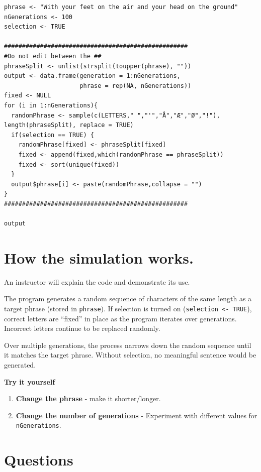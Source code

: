 \documentclass[
  a4paper]{book}
\providecommand{\tightlist}{%
  \setlength{\itemsep}{0pt}\setlength{\parskip}{0pt}}
\begin{document}
\begin{verbatim}
phrase <- "With your feet on the air and your head on the ground"
nGenerations <- 100
selection <- TRUE

###################################################
#Do not edit between the ##
phraseSplit <- unlist(strsplit(toupper(phrase), ""))
output <- data.frame(generation = 1:nGenerations, 
                     phrase = rep(NA, nGenerations))
fixed <- NULL
for (i in 1:nGenerations){
  randomPhrase <- sample(c(LETTERS," ","'","Å","Æ","Ø","!"), length(phraseSplit), replace = TRUE)
  if(selection == TRUE) {
    randomPhrase[fixed] <- phraseSplit[fixed]
    fixed <- append(fixed,which(randomPhrase == phraseSplit))
    fixed <- sort(unique(fixed))
  }
  output$phrase[i] <- paste(randomPhrase,collapse = "")
}
###################################################

output
\end{verbatim}

\section{How the simulation works.}\label{how-the-simulation-works.}

An instructor will explain the code and demonstrate its use.

The program generates a random sequence of characters of the same length as a target phrase (stored in \texttt{phrase}). If selection is turned on (\texttt{selection\ \textless{}-\ TRUE}), correct letters are ``fixed'' in place as the program iterates over generations. Incorrect letters continue to be replaced randomly.

Over multiple generations, the process narrows down the random sequence until it matches the target phrase. Without selection, no meaningful sentence would be generated.

\textbf{Try it yourself }

\begin{enumerate}
\def\labelenumi{\arabic{enumi})}
\tightlist
\item
  \textbf{Change the phrase} - make it shorter/longer.
\item
  \textbf{Change the number of generations} - Experiment with different values for \texttt{nGenerations}.
\end{enumerate}

\section{Questions}\label{questions}
\end{document}
